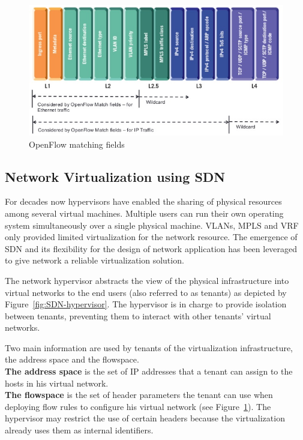 \begin{figure}[h]
    \centering
    \includegraphics[scale=0.7]{figures/openflow-matchfields.png}
    \caption{OpenFlow matching fields~\cite{openflow-matchfields}}
    \label{fig:matching-fields}
\end{figure}

\subsection{Network Virtualization using SDN}
For decades now hypervisors have enabled the sharing of physical resources among several virtual machines.
Multiple users can run their own operating system simultaneously over a single physical machine.
VLANs, MPLS and VRF only provided limited virtualization for the network resource. The emergence of SDN and its flexibility for the design of network application has been leveraged to give network a reliable virtualization solution.

 

The network hypervisor abstracts the view of the physical infrastructure into virtual networks to the end users (also referred to as tenants) as depicted by Figure~\ref{fig:SDN-hypervisor}.
The hypervisor is in charge to provide isolation between tenants, preventing them to interact with other tenants' virtual networks.

Two main information are used by tenants of the virtualization infrastructure, the address space and the flowspace.\\
\textbf{The address space} is the set of IP addresses that a tenant can assign to the hosts in his virtual network.\\
\textbf{The flowspace} is the set of header parameters the tenant can use when deploying flow rules to configure his virtual network (see Figure~\ref{fig:matching-fields}). The hypervisor may restrict the use of certain headers because the virtualization already uses them as internal identifiers.



